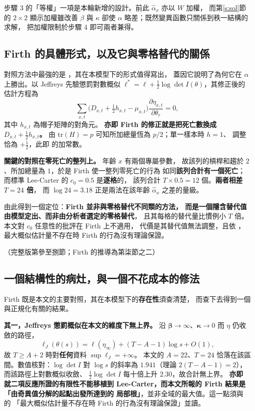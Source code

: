 \documentclass[UTF8, fontset=macnew, a4paper, 12pt]{ctexart}
\begin{document}
步驟 3 的「等權」一項是本輪新增的設計。前此 $\hat\alpha_x$ 亦以 $W$ 加權，
而第\ref{s:sol}節的 $2\times2$ 顯示加權雖改善 $\beta$ 與 $\kappa$
卻使 $\alpha$ 略差；既然變異函數只關係到秩一結構的求解，
把加權限制於步驟 4 即可兩者兼得。

\subsection{Firth 的具體形式，以及它與零格替代的關係}

對照方法中最強的是 \citet{firth1993}，其在本模型下的形式值得寫出，
蓋因它說明了為何它在 $\alpha$ 上勝出。以 Jeffreys 先驗懲罰對數概似
$\ell^{*}=\ell+\tfrac12\log\det I(\theta)$，其修正後的估計方程為
$$\sum_{x,t}\Big(D_{x,t}+\tfrac12 h_{x,t}-\mu_{x,t}\Big)
\frac{\partial\eta_{x,t}}{\partial\theta_r}=0,$$
其中 $h_{x,t}$ 為帽子矩陣的對角元。
\textbf{亦即 Firth 的修正就是把死亡數換成 $D_{x,t}+\tfrac12 h_{x,t}$。}
由 $\mathrm{tr}(H)=p$ 可知所加總量恆為 $p/2$；單一樣本時 $h=1$、
調整恰為 $+\tfrac12$，此即 \citet{haldane1956} 的加常數。

\textbf{關鍵的對照在零死亡的整列上。} 年齡 $x$ 有兩個專屬參數，
故該列的槓桿和趨於 $2$、所加總量為 $1$，於是 Firth 使一整列零死亡的行為
如同\textbf{該列合計有一個死亡}；而標準 Lee-Carter 的 $c_0=0.5$ 是\textbf{逐格}的，
該列合計 $T\times0.5=12$ 個。\textbf{兩者相差 $T=24$ 倍}，
而 $\log 24=3.18$ 正是兩法在該年齡 $\hat\alpha_x$ 之差的量級。

由此得到一個定位：\textbf{Firth 並非與零格替代不同類的方法，
而是一個隱含替代值由模型定出、而非由分析者選定的零格替代}，
且其每格的替代量比慣例小 $T$ 倍。本文對 $c_0$ 任意性的批評在 Firth 上不適用，
代價是其替代值無法調整，且依 \citet{lewis2024}，
最大概似估計量不存在時 Firth 的行為沒有理論保證。

\noindent（完整版第參至捌節；Firth 的推導為第柒節之二）

\subsection{一個結構性的病灶，與一個不花成本的修法}\label{ss:norm}

Firth 既是本文的主要對照，其在本模型下的\textbf{存在性}須查清楚，
而查下去得到一個與正規化有關的結果。

\textbf{其一，Jeffreys 懲罰概似在本文的維度下無上界。}
沿 $\boldsymbol\beta\to\infty$、$\boldsymbol\kappa\to0$ 而 $\eta$ 仍收斂的路徑，
$$\ell_J(\theta(s))=\ell(\eta_\infty)+(T-A-1)\log s+O(1),$$
故 $T\ge A+2$ 時對\textbf{任何}資料 $\sup\ell_J=+\infty$。
本文的 $A=22$、$T=24$ 恰落在該區間。數值核對：$\log\det I$ 對 $\log s$
的斜率為 $1.941$（理論 $2(T-A-1)=2$），而該路徑上對數概似收斂、
$\tfrac12\log\det I$ 每十倍上升 $2.30$，故合計無上界。
\textbf{亦即 \citet{kosmidis2021} 就二項反應所證的有限性不能移植到
Lee-Carter，而本文所報的 Firth 結果是「由奇異值分解的起點出發所達到的
局部根」}，並非全域的最大值。這一點須與 \citet{lewis2024} 的
「最大概似估計量不存在時 Firth 的行為沒有理論保證」並讀。
\end{document}
